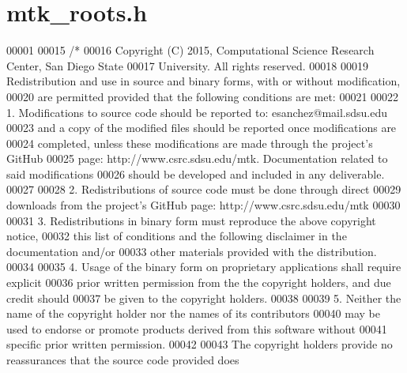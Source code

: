 \hypertarget{mtk__roots_8h_source}{\section{mtk\+\_\+roots.\+h}
\label{mtk__roots_8h_source}
}

\begin{DoxyCode}
00001 
00015 \textcolor{comment}{/*}
00016 \textcolor{comment}{Copyright (C) 2015, Computational Science Research Center, San Diego State}
00017 \textcolor{comment}{University. All rights reserved.}
00018 \textcolor{comment}{}
00019 \textcolor{comment}{Redistribution and use in source and binary forms, with or without modification,}
00020 \textcolor{comment}{are permitted provided that the following conditions are met:}
00021 \textcolor{comment}{}
00022 \textcolor{comment}{1. Modifications to source code should be reported to: esanchez@mail.sdsu.edu}
00023 \textcolor{comment}{and a copy of the modified files should be reported once modifications are}
00024 \textcolor{comment}{completed, unless these modifications are made through the project's GitHub}
00025 \textcolor{comment}{page: http://www.csrc.sdsu.edu/mtk. Documentation related to said modifications}
00026 \textcolor{comment}{should be developed and included in any deliverable.}
00027 \textcolor{comment}{}
00028 \textcolor{comment}{2. Redistributions of source code must be done through direct}
00029 \textcolor{comment}{downloads from the project's GitHub page: http://www.csrc.sdsu.edu/mtk}
00030 \textcolor{comment}{}
00031 \textcolor{comment}{3. Redistributions in binary form must reproduce the above copyright notice,}
00032 \textcolor{comment}{this list of conditions and the following disclaimer in the documentation and/or}
00033 \textcolor{comment}{other materials provided with the distribution.}
00034 \textcolor{comment}{}
00035 \textcolor{comment}{4. Usage of the binary form on proprietary applications shall require explicit}
00036 \textcolor{comment}{prior written permission from the the copyright holders, and due credit should}
00037 \textcolor{comment}{be given to the copyright holders.}
00038 \textcolor{comment}{}
00039 \textcolor{comment}{5. Neither the name of the copyright holder nor the names of its contributors}
00040 \textcolor{comment}{may be used to endorse or promote products derived from this software without}
00041 \textcolor{comment}{specific prior written permission.}
00042 \textcolor{comment}{}
00043 \textcolor{comment}{The copyright holders provide no reassurances that the source code provided does}

\end{DoxyCode}
